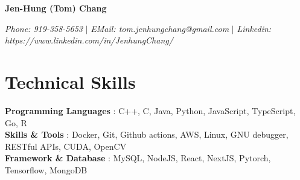 \documentclass[letterpaper,11pt]{article}
\newcommand{\namespace}{
\vspace{3pt}
}
\newcommand{\sectionspace}{
\vspace{-20pt}
}
\newcommand{\subheadingtitlevspace}{
\vspace{-3pt}
}
\newcommand{\titleItem}[1]{
  \textbf{#1}
}
\begin{document}
\begin{center}
    \textbf{\Huge{\center Jen-Hung (Tom) Chang }} \\
    \namespace
    \textit{Phone: 919-358-5653} $|$ 
    \textit{EMail: tom.jenhungchang@gmail.com} $|$ 
    \textit{Linkedin: https://www.linkedin.com/in/JenhungChang/}
    \vspace{-8pt}
\end{center}



    

\section{Technical Skills}
\subheadingtitlevspace
  \begin{itemize}[leftmargin=0in, label={}]
    {\item{
      \titleItem{Programming Languages}{: C++, C, Java, Python, JavaScript, TypeScript, Go, R} \\
      \titleItem{Skills \& Tools}{: Docker, Git, Github actions, AWS, Linux, GNU debugger, RESTful APIs, CUDA, OpenCV} \\
      \titleItem{Framework \& Database}{: MySQL, NodeJS, React, NextJS, Pytorch, Tensorflow, MongoDB} \\
    }}
  \end{itemize}
\sectionspace
\end{document}
